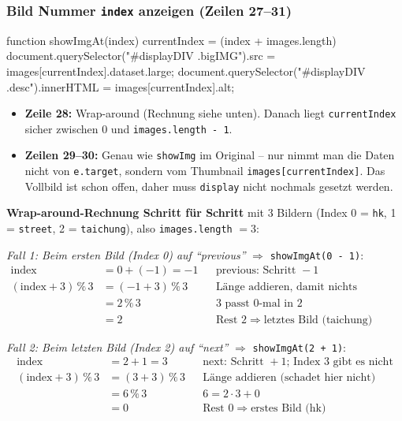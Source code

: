 \documentclass[a4paper,11pt]{article}
\begin{document}
\subsubsection*{Bild Nummer \texttt{index} anzeigen (Zeilen 27--31)}
\begin{code}[firstnumber=27]
function showImgAt(index) {
   currentIndex = (index + images.length) %
   document.querySelector("#displayDIV .bigIMG").src = images[currentIndex].dataset.large;
   document.querySelector("#displayDIV .desc").innerHTML = images[currentIndex].alt;
}
\end{code}
\begin{itemize}
\item \textbf{Zeile 28:} Wrap-around (Rechnung siehe unten). Danach liegt \texttt{currentIndex} sicher zwischen 0 und
      \texttt{images.length - 1}.
\item \textbf{Zeilen 29--30:} Genau wie \texttt{showImg} im Original -- nur nimmt man die Daten nicht von
      \texttt{e.target}, sondern vom Thumbnail \texttt{images[currentIndex]}. Das Vollbild ist schon offen, daher
      muss \texttt{display} nicht nochmals gesetzt werden.
\end{itemize}

\textbf{Wrap-around-Rechnung Schritt für Schritt} mit 3 Bildern (Index 0 = \texttt{hk}, 1 = \texttt{street},
2 = \texttt{taichung}), also \texttt{images.length} $= 3$:

\emph{Fall 1: Beim ersten Bild (Index 0) auf "`previous"'} $\Rightarrow$ \texttt{showImgAt(0 - 1)}:
\begin{align*}
\text{index} &= 0 + (-1) = -1 && \text{previous: Schritt } -1\\
(\text{index} + 3) \,\%\, 3 &= (-1 + 3) \,\%\, 3 && \text{Länge addieren, damit nichts Negatives entsteht}\\
&= 2 \,\%\, 3 && 3 \text{ passt 0-mal in } 2\\
&= 2 && \text{Rest } 2 \Rightarrow \text{letztes Bild (taichung)}
\end{align*}

\emph{Fall 2: Beim letzten Bild (Index 2) auf "`next"'} $\Rightarrow$ \texttt{showImgAt(2 + 1)}:
\begin{align*}
\text{index} &= 2 + 1 = 3 && \text{next: Schritt } +1\text{; Index 3 gibt es nicht}\\
(\text{index} + 3) \,\%\, 3 &= (3 + 3) \,\%\, 3 && \text{Länge addieren (schadet hier nicht)}\\
&= 6 \,\%\, 3 && 6 = 2 \cdot 3 + 0\\
&= 0 && \text{Rest } 0 \Rightarrow \text{erstes Bild (hk)}
\end{align*}
\end{document}
